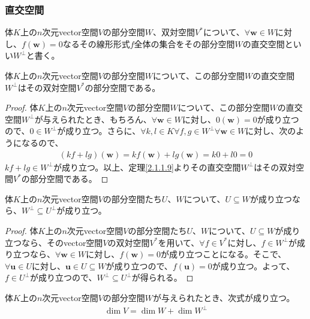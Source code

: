 \documentclass[dvipdfmx]{jsarticle}
\begin{document}
\subsubsection{直交空間}%
\begin{dfn}
体$K$上の$n$次元vector空間$V$の部分空間$W$、双対空間$V^{*}$について、$\forall\mathbf{w} \in W$に対し、$f\left( \mathbf{w} \right) = 0$なるその線形形式$f$全体の集合をその部分空間$W$の直交空間といい$W^{\bot}$と書く。
\end{dfn}
\begin{thm}\label{2.4.2.10}
体$K$上の$n$次元vector空間$V$の部分空間$W$について、この部分空間$W$の直交空間$W^{\bot}$はその双対空間$V^{*}$の部分空間である。
\end{thm}
\begin{proof}
体$K$上の$n$次元vector空間$V$の部分空間$W$について、この部分空間$W$の直交空間$W^{\bot}$が与えられたとき、もちろん、$\forall\mathbf{w} \in W$に対し、$0\left( \mathbf{w} \right) = 0$が成り立つので、$0 \in W^{\bot}$が成り立つ。さらに、$\forall k,l \in K\forall f,g \in W^{\bot}\forall\mathbf{w} \in W$に対し、次のようになるので、
\begin{align*}
(kf + lg)\left( \mathbf{w} \right) = kf\left( \mathbf{w} \right) + lg\left( \mathbf{w} \right) = k0 + l0 = 0
\end{align*}
$kf + lg \in W^{\bot}$が成り立つ。以上、定理\ref{2.1.1.9}よりその直交空間$W^{\bot}$はその双対空間$V^{*}$の部分空間である。
\end{proof}
\begin{thm}\label{2.4.2.11}
体$K$上の$n$次元vector空間$V$の部分空間たち$U$、$W$について、$U \subseteq W$が成り立つなら、$W^{\bot} \subseteq U^{\bot}$が成り立つ。
\end{thm}
\begin{proof}
体$K$上の$n$次元vector空間$V$の部分空間たち$U$、$W$について、$U \subseteq W$が成り立つなら、そのvector空間$V$の双対空間$V^{*}$を用いて、$\forall f \in V^{*}$に対し、$f \in W^{\bot}$が成り立つなら、$\forall\mathbf{w} \in W$に対し、$f\left( \mathbf{w} \right) = 0$が成り立つことになる。そこで、$\forall\mathbf{u} \in U$に対し、$\mathbf{u} \in U \subseteq W$が成り立つので、$f\left( \mathbf{u} \right) = 0$が成り立つ。よって、$f \in U^{\bot}$が成り立つので、$W^{\bot} \subseteq U^{\bot}$が得られる。
\end{proof}
\begin{thm}\label{2.4.2.12}
体$K$上の$n$次元vector空間$V$の部分空間$W$が与えられたとき、次式が成り立つ。
\begin{align*}
\dim V = \dim W + \dim W^{\bot}
\end{align*}
\end{thm}
\end{document}
